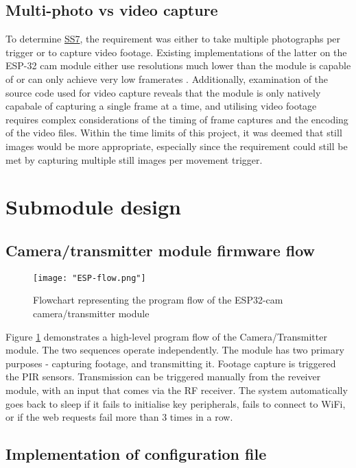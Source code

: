 \documentclass[class=report,11pt,crop=false]{standalone}
\begin{document}
\subsection{Multi-photo vs video capture}

To determine \hyperlink{tab:firmware-requirements}{SS7}, the requirement was either to take multiple photographs per trigger or to capture video footage. Existing implementations of the latter on the ESP-32 cam module either use resolutions much lower than the module is capable of or can only achieve very low framerates \cite{zahary2019esp}. Additionally, examination of the source code used for video capture reveals that the module is only natively capabale of capturing a single frame at a time, and utilising video footage requires complex considerations of the timing of frame captures and the encoding of the video files. Within the time limits of this project, it was deemed that still images would be more appropriate, especially since the requirement could still be met by capturing multiple still images per movement trigger. 

\section{Submodule design} \label{s:firmware-design-process}

\subsection{Camera/transmitter module firmware flow} \label{ss:espflow}

\begin{figure}[ht]
    \centering
    \texttt{[image: "ESP-flow.png"]}
    \caption{Flowchart representing the program flow of the ESP32-cam camera/transmitter module}
    \label{fig:espflow}
\end{figure}

Figure \ref{fig:espflow} demonstrates a high-level program flow of the Camera/Transmitter module. The two sequences operate independently. The module has two primary purposes - capturing footage, and transmitting it. Footage capture is triggered the PIR sensors. Transmission can be triggered manually from the reveiver module, with an input that comes via the RF receiver. The system automatically goes back to sleep if it fails to initialise key peripherals, fails to connect to WiFi, or if the web requests fail more than 3 times in a row.

\subsection{Implementation of configuration file}
\end{document}
